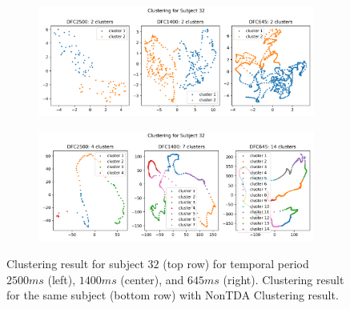 \begin{figure}[H]%
	\centering
	\begin{subfigure}[t]{1\textwidth}
		\centering
		\hspace{8mm}
		\includegraphics[width=1\textwidth, trim={0cm, 0.0cm, 0.0cm, 0.0cm}]{figures/clusters/subject_32.png}\hfill
	\end{subfigure}
	\begin{subfigure}[t]{1\textwidth}
		\centering
		\hspace{8mm}
		\includegraphics[width=1\textwidth, trim={0cm, 0.0cm, 0.0cm, 0.0cm}]{figures/clusters/subject_32_non_tda.png}\hfill
	\end{subfigure}
	\caption{Clustering result for subject $32$ (top row) for temporal period $2500ms$ (left), $1400ms$ (center), and $645ms$ (right). Clustering result for the same subject (bottom row) with NonTDA Clustering result.}
	\label{fig:clus}
\end{figure}

